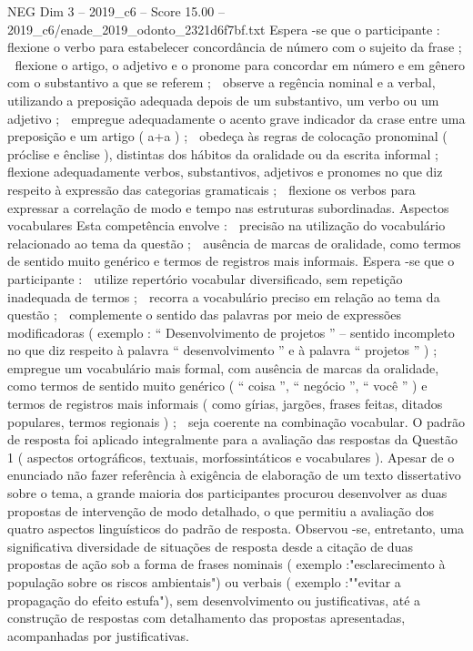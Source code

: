 \begin{textsample}{NEG Dim 3 – 2019\_c6 – Score 15.00 – 2019\_c6/enade\_2019\_odonto\_2321d6f7bf.txt}
Espera -se que o participante :  flexione o verbo para estabelecer concordância de número com o sujeito da frase ;  flexione o artigo, o adjetivo e o pronome para concordar em número e em gênero com o substantivo a que se referem ;  observe a regência nominal e a verbal, utilizando a preposição adequada depois de um substantivo, um verbo ou um adjetivo ;  empregue adequadamente o acento grave indicador da crase entre uma preposição e um artigo ( a+a ) ;  obedeça às regras de colocação pronominal ( próclise e ênclise ), distintas dos hábitos da oralidade ou da escrita informal ;  flexione adequadamente verbos, substantivos, adjetivos e pronomes no que diz respeito à expressão das categorias gramaticais ;  flexione os verbos para expressar a correlação de modo e tempo nas estruturas subordinadas.
Aspectos vocabulares Esta competência envolve :  precisão na utilização do vocabulário relacionado ao tema da questão ;  ausência de marcas de oralidade, como termos de sentido muito genérico e termos de registros mais informais.
Espera -se que o participante :  utilize repertório vocabular diversificado, sem repetição inadequada de termos ;  recorra a vocabulário preciso em relação ao tema da questão ;  complemente o sentido das palavras por meio de expressões modificadoras ( exemplo : “ Desenvolvimento de projetos ” – sentido incompleto no que diz respeito à palavra “ desenvolvimento ” e à palavra “ projetos ” ) ;  empregue um vocabulário mais formal, com ausência de marcas da oralidade, como termos de sentido muito genérico ( “ coisa ”, “ negócio ”, “ você ” ) e termos de registros mais informais ( como gírias, jargões, frases feitas, ditados populares, termos regionais ) ;  seja coerente na combinação vocabular.
O padrão de resposta foi aplicado integralmente para a avaliação das respostas da Questão 1 ( aspectos ortográficos, textuais, morfossintáticos e vocabulares ).
Apesar de o enunciado não fazer referência à exigência de elaboração de um texto dissertativo sobre o tema, a grande maioria dos participantes procurou desenvolver as duas propostas de intervenção de modo detalhado, o que permitiu a avaliação dos quatro aspectos linguísticos do padrão de resposta.
Observou -se, entretanto, uma significativa diversidade de situações de resposta desde a citação de duas propostas de ação sob a forma de frases nominais ( exemplo :"esclarecimento à população sobre os riscos ambientais") ou verbais ( exemplo :""evitar a propagação do efeito estufa"), sem desenvolvimento ou justificativas, até a construção de respostas com detalhamento das propostas apresentadas, acompanhadas por justificativas.

\end{textsample}
